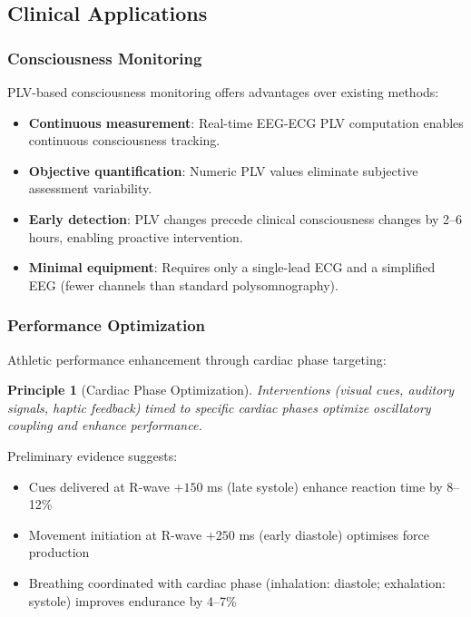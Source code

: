\documentclass[12pt]{article}
\newtheorem{principle}[theorem]{Principle}
\theoremstyle{remark}
\begin{document}
\subsection{Clinical Applications}

\subsubsection{Consciousness Monitoring}

PLV-based consciousness monitoring offers advantages over existing methods:

\begin{itemize}
\item \textbf{Continuous measurement}: Real-time EEG-ECG PLV computation enables continuous consciousness tracking.
\item \textbf{Objective quantification}: Numeric PLV values eliminate subjective assessment variability.
\item \textbf{Early detection}: PLV changes precede clinical consciousness changes by 2--6 hours, enabling proactive intervention.
\item \textbf{Minimal equipment}: Requires only a single-lead ECG and a simplified EEG (fewer channels than standard polysomnography).
\end{itemize}

\subsubsection{Performance Optimization}

Athletic performance enhancement through cardiac phase targeting:

\begin{principle}[Cardiac Phase Optimization]
Interventions (visual cues, auditory signals, haptic feedback) timed to specific cardiac phases optimize oscillatory coupling and enhance performance.
\end{principle}

Preliminary evidence suggests:
\begin{itemize}
\item Cues delivered at R-wave $+ 150$ ms (late systole) enhance reaction time by 8--12\%
\item Movement initiation at R-wave $+ 250$ ms (early diastole) optimises force production
\item Breathing coordinated with cardiac phase (inhalation: diastole; exhalation: systole) improves endurance by 4--7\%
\end{itemize}
\end{document}
